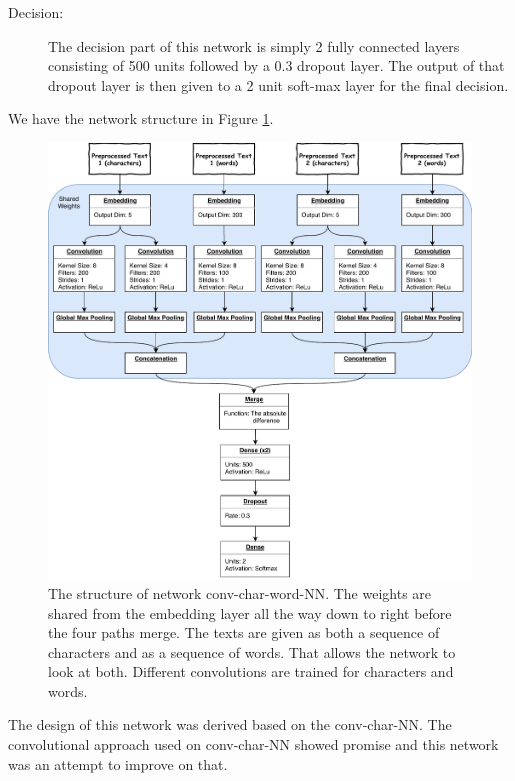 \begin{description}
    \item[Decision:]

        The decision part of this network is simply 2 fully connected layers
        consisting of 500 units followed by a 0.3 dropout layer. The output of
        that dropout layer is then given to a 2 unit soft-max layer for the
        final decision.

\end{description}

We have the network structure in Figure \ref{fig:conv-char-NN-model}.

\begin{figure}
    \centering
    \includegraphics[width=\textwidth]{./pictures/experiments/conv_char_word_nn/model}
    \caption{The structure of network \gls{conv-char-word-NN}. The weights are
        shared from the embedding layer all the way down to right before
        the four paths merge. The texts are given as both a sequence of
        characters and as a sequence of words. That allows the network to look
        at both. Different convolutions are trained for characters and words.}
    \label{fig:conv-char-NN-model}
\end{figure}

The design of this network was derived based on the \gls{conv-char-NN}. The
convolutional approach used on \gls{conv-char-NN} showed promise and this
network was an attempt to improve on that.

